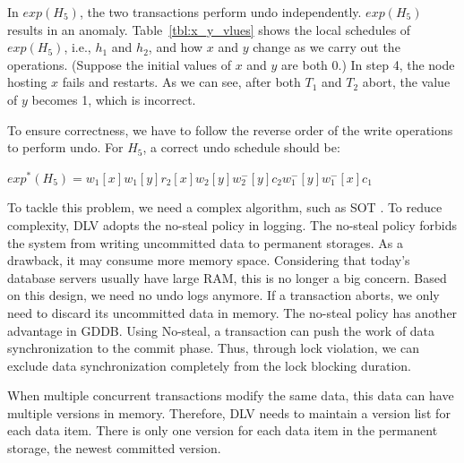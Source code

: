 \documentclass[conference]{IEEEtran}
\begin{document}
In $exp(H_5)$, the two transactions perform undo independently. $exp(H_5)$ results in an anomaly.
Table~\ref{tbl:x_y_vlues} shows the local schedules of $exp(H_5)$, i.e., ${h_1}$ and  ${h_2}$, and how ${x}$ and ${y}$ change as we carry out the operations.
(Suppose the initial values of ${x}$ and ${y}$ are both 0.)
In step 4, the node hosting ${x}$ fails and restarts.
As we can see, after both ${T_1}$ and ${T_2}$ abort, the value of ${y}$ becomes 1, which is incorrect.

To ensure correctness, we have to follow the reverse order of the write operations to perform undo.
For ${H_5}$, a correct undo schedule should be:
\begin{center}
${exp^*(H_5) = w_1[x]w_1[y]r_2[x]w_2[y]w^-_2[y]c_2w^-_1[y]w^-_1[x]c_1}$
\end{center}

To tackle this problem, we need a complex algorithm, such as SOT \cite{UnifyCR:journals/is/AlonsoVABASW94}.
To reduce complexity, DLV adopts the no-steal policy in logging.
The no-steal policy forbids the system from writing uncommitted data to permanent storages.
As a drawback, it may consume more memory space.
Considering that today's database servers usually have large RAM, this is no longer a big concern.
Based on this design, we need no undo logs anymore. If a transaction aborts, we only need to discard its uncommitted data in memory.
The no-steal policy has another advantage in GDDB.
Using No-steal, a transaction can push the work of data synchronization to the commit phase.
Thus, through lock violation, we can exclude data synchronization completely from the lock blocking duration.

When multiple concurrent transactions modify the same data, this data can have multiple versions in memory.
Therefore, DLV needs to maintain a version list for each data item.
There is only one version for each data item in the permanent storage, the newest committed version.
\end{document}
